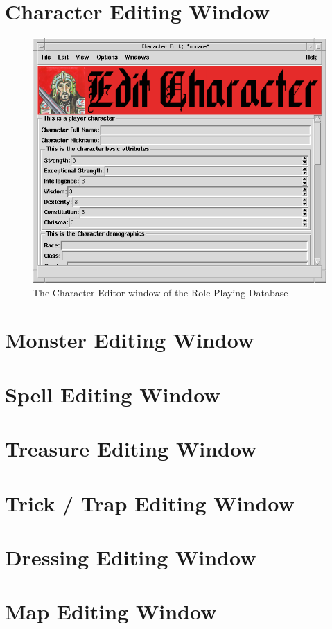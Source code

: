 \section{Character Editing Window}
\label{Character}

\begin{figure}[hbpt]
\begin{centering}
\includegraphics[width=5in]{CharacterEditor.png}
\caption{The Character Editor window of the Role Playing Database}
\label{fig:char}
\end{centering}
\end{figure}

\section{Monster Editing Window}
\label{Monster}

\section{Spell Editing Window}
\label{Spell}

\section{Treasure Editing Window}
\label{Treasure}

\section{Trick / Trap Editing Window}
\label{TrickTrap}

\section{Dressing Editing Window}
\label{Dressing}

\section{Map Editing Window}
\label{Map}


